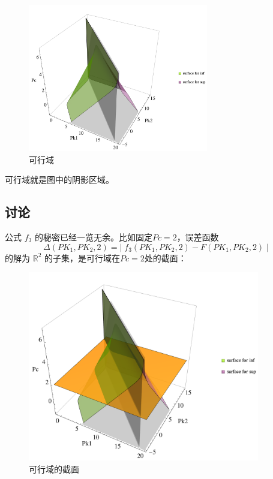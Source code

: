 \documentclass[UTF-8]{ctexart}
\newcommand{\R}{\mathbb{R}}
\newcommand{\0}{\boldsymbol{0}}
\begin{document}
\begin{figure}[ht]
    \centering
    \includegraphics[width=0.7\textwidth]{完整.png}
    \caption{\kaishu 可行域}
    \label{fig:完整}
\end{figure}

可行域就是图中的阴影区域。

\subsection{讨论}
公式 $f_3$ 的秘密已经一览无余。比如固定$Pc=2$，误差函数 
\[
    \Delta (PK_1,PK_2,2)=|\; f_3(PK_1,PK_2,2)-F(PK_1,PK_2,2)\;|
\]
的解为 $\R^2$ 的子集，是可行域在$Pc=2$处的截面：

\begin{figure}[ht]
    \centering
    \includegraphics[width=0.9\textwidth]{截面.png}
    \caption{\kaishu 可行域的截面}
    \label{fig:截面}
\end{figure}
\end{document}
